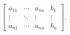 \[\begin{bmatrix}a_{11}&\cdots&a_{1n}&b_{1}\\
\vdots&\ddots&\vdots&\vdots\\
a_{n1}&\cdots&a_{nn}&b_{n}\end{bmatrix}.\]